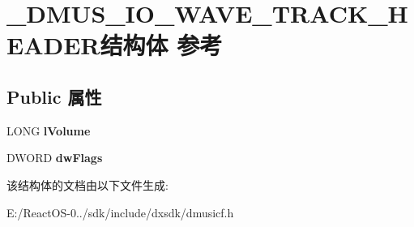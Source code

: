 \hypertarget{struct___d_m_u_s___i_o___w_a_v_e___t_r_a_c_k___h_e_a_d_e_r}{}\section{\+\_\+\+D\+M\+U\+S\+\_\+\+I\+O\+\_\+\+W\+A\+V\+E\+\_\+\+T\+R\+A\+C\+K\+\_\+\+H\+E\+A\+D\+E\+R结构体 参考}
\label{struct___d_m_u_s___i_o___w_a_v_e___t_r_a_c_k___h_e_a_d_e_r}
\subsection*{Public 属性}
\begin{DoxyCompactItemize}
\item 
\mbox{\label{struct___d_m_u_s___i_o___w_a_v_e___t_r_a_c_k___h_e_a_d_e_r_acef2d58ea3350e45f8baad594f32c549}} 
L\+O\+NG {\bfseries l\+Volume}
\item 
\mbox{\label{struct___d_m_u_s___i_o___w_a_v_e___t_r_a_c_k___h_e_a_d_e_r_a3e636815b3718c847886517cacd15595}} 
D\+W\+O\+RD {\bfseries dw\+Flags}
\end{DoxyCompactItemize}


该结构体的文档由以下文件生成\+:\begin{DoxyCompactItemize}
\item 
E\+:/\+React\+O\+S-\/0../sdk/include/dxsdk/dmusicf.\+h\end{DoxyCompactItemize}
